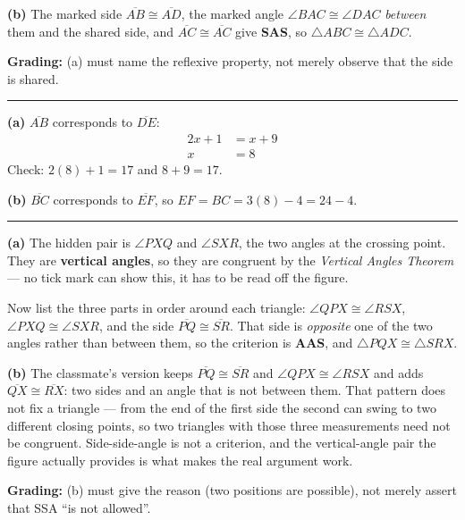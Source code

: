 \documentclass[12pt]{article}
\begin{document}
\textbf{(b)} The marked side $\overline{AB} \cong \overline{AD}$, the marked angle $\angle BAC \cong \angle DAC$ \emph{between} them and the shared side, and $\overline{AC} \cong \overline{AC}$ give \textbf{SAS}, so $\triangle ABC \cong \triangle ADC$.

\textbf{Grading:} (a) must name the reflexive property, not merely observe that the side is shared.

\vspace{0.2cm}\noindent\rule{\linewidth}{0.2pt}


\textbf{(a)} $\overline{AB}$ corresponds to $\overline{DE}$:
\begin{align*}
  2x + 1 &= x + 9 \\
  x &= 8
\end{align*}
Check: $2(8) + 1 = 17$ and $8 + 9 = 17$. 

\textbf{(b)} $\overline{BC}$ corresponds to $\overline{EF}$, so $EF = BC = 3(8) - 4 = 24 - 4$. 

\vspace{0.2cm}\noindent\rule{\linewidth}{0.2pt}


\textbf{(a)} The hidden pair is $\angle PXQ$ and $\angle SXR$, the two angles at the crossing point. They are \textbf{vertical angles}, so they are congruent by the \emph{Vertical Angles Theorem} --- no tick mark can show this, it has to be read off the figure.

Now list the three parts in order around each triangle: $\angle QPX \cong \angle RSX$, $\angle PXQ \cong \angle SXR$, and the side $\overline{PQ} \cong \overline{SR}$. That side is \emph{opposite} one of the two angles rather than between them, so the criterion is \textbf{AAS}, and $\triangle PQX \cong \triangle SRX$.

\textbf{(b)} The classmate's version keeps $\overline{PQ} \cong \overline{SR}$ and $\angle QPX \cong \angle RSX$ and adds $\overline{QX} \cong \overline{RX}$: two sides and an angle that is not between them. That pattern does not fix a triangle --- from the end of the first side the second can swing to two different closing points, so two triangles with those three measurements need not be congruent. Side-side-angle is not a criterion, and the vertical-angle pair the figure actually provides is what makes the real argument work.

\textbf{Grading:} (b) must give the reason (two positions are possible), not merely assert that SSA ``is not allowed''.
\end{document}
